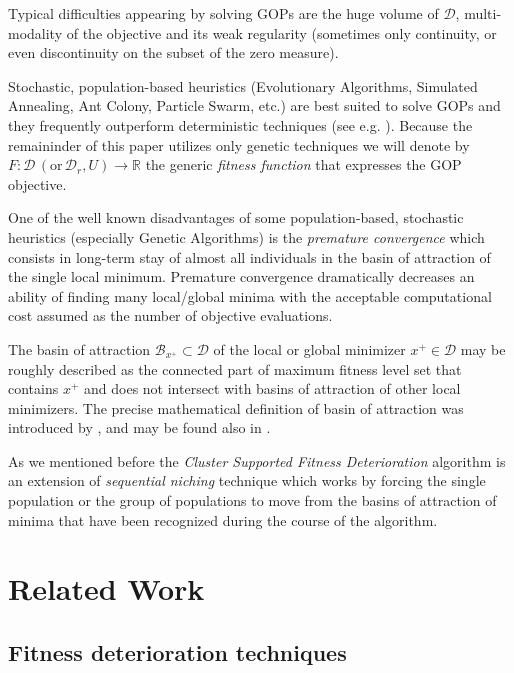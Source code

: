 Typical difficulties appearing by solving GOPs are 
the huge volume of $\mathcal{D}$, multi-modality of the objective
and its weak regularity (sometimes only continuity, or even
discontinuity on the subset of the zero measure).

Stochastic, population-based heuristics (Evolutionary Algorithms, Simulated Annealing, Ant Colony, 
Particle Swarm, etc.) are best suited to solve GOPs
and they frequently outperform deterministic techniques
(see e.g. \cite{PardalosRomeijn2002}).
Because the remaininder of this paper utilizes only genetic techniques
we will denote by 
$F: \mathcal{D} \, (\text{or} \, \mathcal{D}_r, U) \rightarrow \mathbb{R}$ 
the generic \textit{fitness function} that expresses the GOP objective.

One of the well known disadvantages of some population-based, stochastic heuristics 
(especially Genetic Algorithms) is the \textit{premature convergence} which
consists in long-term stay of almost all individuals in the basin of attraction
of the single local minimum. Premature convergence dramatically decreases 
an ability of finding many local/global minima with the acceptable 
computational cost assumed as the number of objective evaluations.


The basin of attraction $\mathcal{B}_{x^+} \subset \mathcal{D}$ 
of the local or global minimizer ${x^+} \in \mathcal{D}$ may be roughly described 
as the connected part of maximum fitness level set that contains
${x^+}$ and does not intersect with basins of attraction of other
local minimizers.
The precise mathematical definition of basin of attraction
was introduced by \cite{RinnoyKanTimmer1987a}, \cite{DixonSzego1975}
and may be found also in \cite{Schaefer2007}.

As we mentioned before the \textit{Cluster Supported Fitness
Deterioration} algorithm is an extension of  \textit{sequential niching}
technique which works by forcing the single population or the group of
populations to move from the basins of attraction of minima that have been 
recognized during the course of the algorithm.

\section{Related Work}

\subsection{Fitness deterioration techniques}
\label{sec:Fdt}



